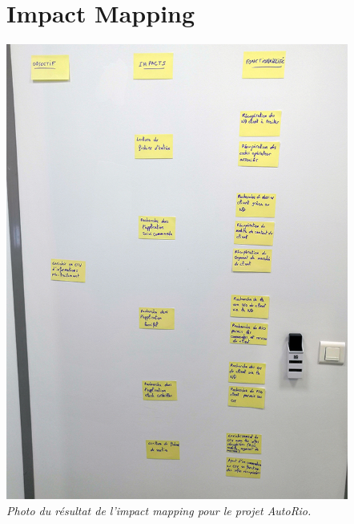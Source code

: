 \documentclass[a4paper,twoside,12pt,openright]{report}
\begin{document}
\chapter{Impact Mapping}
\begin{center}
\includegraphics[height=15cm]{impactMappingRIO.jpg}\\
\itshape Photo du résultat de l'impact mapping pour le projet AutoRio.
\end{center}
\end{document}

